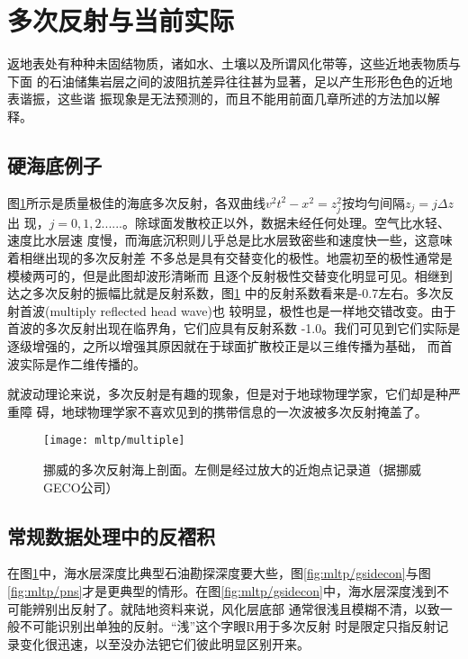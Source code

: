\section{多次反射与当前实际}
\label{sec:5.5}

返地表处有种种未固结物质，诸如水、土壤以及所谓风化带等，这些近地表物质与下面
的石油储集岩层之间的波阻抗差异往往甚为显著，足以产生形形色色的近地表谐振，这些谐
振现象是无法预测的，而且不能用前面几章所述的方法加以解释。

\subsection{硬海底例子}
\label{sec:5.5.1}

图\ref{fig:mltp/multiple}所示是质量极佳的海底多次反射，各双曲线$v^2t^2-x^2
=z_j^2$按均勻间隔$z_j=j\Delta z$出
现，$j=0,1,2......$。除球面发散校正以外，数据未经任何处理。空气比水轻、速度比水层速
度慢，而海底沉积则儿乎总是比水层致密些和速度快一些，这意味着相继出现的多次反射差
不多总是具有交替变化的极性。地震初至的极性通常是模棱两可的，但是此图却波形清晰而
且逐个反射极性交替变化明显可见。相继到达之多次反射的振幅比就是反射系数，图\ref{fig:mltp/multiple}
中的反射系数看来是-0.7左右。多次反射首波(multiply reflected head wave)也
较明显，极性也是一样地交错改变。由于首波的多次反射出现在临界角，它们应具有反射系数
-1.0。我们可见到它们实际是逐级增强的，之所以增强其原因就在于球面扩散校正是以三维传播为基础，
而首波实际是作二维传播的。

就波动理论来说，多次反射是有趣的现象，但是对于地球物理学家，它们却是种严重障
碍，地球物理学家不喜欢见到的携带信息的一次波被多次反射掩盖了。



\begin{figure}[H]
\centering
\texttt{[image: mltp/multiple]}
\caption[multiple]{挪威的多次反射海上剖面。左侧是经过放大的近炮点记录道（据挪威GECO公司）
}
\label{fig:mltp/multiple}
\end{figure}

\subsection{常规数据处理中的反褶积}
\label{sec:5.5.2}

在图\ref{fig:mltp/multiple}中，海水层深度比典型石油勘探深度要大些，图\ref{fig:mltp/gsidecon}与图\ref{fig:mltp/pns}才是更典型的情形。在图\ref{fig:mltp/gsidecon}中，海水层深度浅到不可能辨别出反射了。就陆地资料来说，风化层底部
通常很浅且模糊不清，以致一般不可能识别出单独的反射。“浅”这个字眼R用于多次反射
时是限定只指反射记录变化很迅速，以至没办法钯它们彼此明显区别开来。

